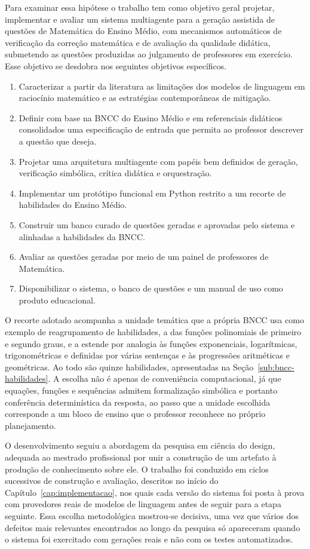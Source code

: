Para examinar essa hipótese o trabalho tem como objetivo geral projetar, implementar e avaliar um
sistema multiagente para a geração assistida de questões de Matemática do Ensino Médio, com
mecanismos automáticos de verificação da correção matemática e de avaliação da qualidade
didática, submetendo as questões produzidas ao julgamento de professores em exercício. Esse
objetivo se desdobra nos seguintes objetivos específicos.

\begin{enumerate}
\item Caracterizar a partir da literatura as limitações dos modelos de linguagem em raciocínio
  matemático e as estratégias contemporâneas de mitigação.
\item Definir com base na BNCC do Ensino Médio e em referenciais didáticos consolidados uma
  especificação de entrada que permita ao professor descrever a questão que deseja.
\item Projetar uma arquitetura multiagente com papéis bem definidos de geração, verificação
  simbólica, crítica didática e orquestração.
\item Implementar um protótipo funcional em Python restrito a um recorte de habilidades do Ensino
  Médio.
\item Construir um banco curado de questões geradas e aprovadas pelo sistema e alinhadas a
  habilidades da BNCC.
\item Avaliar as questões geradas por meio de um painel de professores de Matemática.
\item Disponibilizar o sistema, o banco de questões e um manual de uso como produto educacional.
\end{enumerate}

O recorte adotado acompanha a unidade temática que a própria BNCC usa como exemplo de
reagrupamento de habilidades, a das funções polinomiais de primeiro e segundo graus, e a estende
por analogia às funções exponenciais, logarítmicas, trigonométricas e definidas por várias
sentenças e às progressões aritméticas e geométricas. Ao todo são quinze habilidades, apresentadas
na Seção~\ref{sub:bncc-habilidades}. A escolha não é apenas de conveniência computacional, já que
equações, funções e sequências admitem formalização simbólica e portanto conferência
determinística da resposta, ao passo que a unidade escolhida corresponde a um bloco de ensino que
o professor reconhece no próprio planejamento.

O desenvolvimento seguiu a abordagem da pesquisa em ciência do design, adequada ao mestrado
profissional por unir a construção de um artefato à produção de conhecimento sobre ele. O
trabalho foi conduzido em ciclos sucessivos de construção e avaliação, descritos no início do
Capítulo~\ref{cap:implementacao}, nos quais cada versão do sistema foi posta à prova com
provedores reais de modelos de linguagem antes de seguir para a etapa seguinte. Essa escolha
metodológica mostrou-se decisiva, uma vez que vários dos defeitos mais relevantes encontrados ao
longo da pesquisa só apareceram quando o sistema foi exercitado com gerações reais e não com os
testes automatizados.

